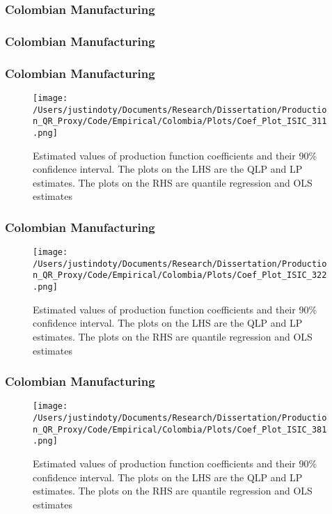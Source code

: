 \documentclass{beamer}
\begin{document}

\begin{frame}
\frametitle{Colombian Manufacturing}
\scriptsize

\end{frame}

\begin{frame}
\frametitle{Colombian Manufacturing}
\scriptsize

\end{frame}

\begin{frame}
\frametitle{Colombian Manufacturing}
\begin{figure}[ht]
\centering
\texttt{[image: /Users/justindoty/Documents/Research/Dissertation/Production\_QR\_Proxy/Code/Empirical/Colombia/Plots/Coef\_Plot\_ISIC\_311.png]}
\caption{Estimated values of production function coefficients and their 90\% confidence interval. The plots on the LHS are the QLP and LP estimates. The plots on the RHS are quantile regression and OLS estimates}
\end{figure}
\end{frame}

\begin{frame}
\frametitle{Colombian Manufacturing}
\begin{figure}[ht]
\centering
\texttt{[image: /Users/justindoty/Documents/Research/Dissertation/Production\_QR\_Proxy/Code/Empirical/Colombia/Plots/Coef\_Plot\_ISIC\_322.png]}
\caption{Estimated values of production function coefficients and their 90\% confidence interval. The plots on the LHS are the QLP and LP estimates. The plots on the RHS are quantile regression and OLS estimates}
\end{figure}
\end{frame}

\begin{frame}
\frametitle{Colombian Manufacturing}
\begin{figure}[ht]
\centering
\texttt{[image: /Users/justindoty/Documents/Research/Dissertation/Production\_QR\_Proxy/Code/Empirical/Colombia/Plots/Coef\_Plot\_ISIC\_381.png]}
\caption{Estimated values of production function coefficients and their 90\% confidence interval. The plots on the LHS are the QLP and LP estimates. The plots on the RHS are quantile regression and OLS estimates}
\end{figure}
\end{frame}
\end{document}
